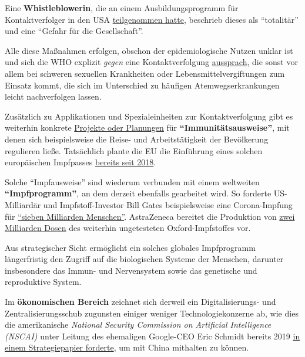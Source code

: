 Eine \textbf{Whistleblowerin}, die an einem Ausbildungsprogramm für
Kontaktverfolger in den USA
\href{https://www.youtube.com/watch?v=qFUyZWw7qoc}{teilgenommen hatte},
beschrieb dieses als ``totalitär'' und eine ``Gefahr für die
Gesellschaft''.

Alle diese Maßnahmen erfolgen, obschon der epidemiologische Nutzen
unklar ist und sich die WHO explizit \emph{gegen} eine Kontaktverfolgung
\href{https://apps.who.int/iris/bitstream/handle/10665/329438/9789241516839-eng.pdf\#page=9}{aussprach},
die sonst vor allem bei schweren sexuellen Krankheiten oder
Lebensmittelvergiftungen zum Einsatz kommt, die sich im Unterschied zu
häufigen Atemwegserkrankungen leicht nachverfolgen lassen.

Zusätzlich zu Applikationen und Spezialeinheiten zur Kontaktverfolgung
gibt es weiterhin konkrete
\href{https://www.msn.com/en-us/news/world/the-uk-government-is-in-talks-with-facial-recognition-firms-to-develop-covid-19-immunity-passports/ar-BB12J6It}{Projekte
oder Planungen} für \textbf{``Immunitätsausweise''}, mit denen sich
beispielsweise die Reise- und Arbeitstätigkeit der Bevölkerung
regulieren ließe. Tatsächlich plante die EU die Einführung eines solchen
europäischen Impfpasses
\href{https://off-guardian.org/2020/05/22/report-eu-planning-vaccination-passport-since-2018/}{bereits
seit 2018}.

Solche ``Impfausweise'' sind wiederum verbunden mit einem weltweiten
\textbf{``Impfprogramm''}, an dem derzeit ebenfalls gearbeitet wird. So
forderte US-Milliardär und Impfstoff-Investor Bill Gates beispielsweise
eine Corona-Impfung für
\href{https://www.businessinsider.com/bill-gates-14-billion-doses-coronavirus-vaccine-may-be-needed-2020-5}{``sieben
Milliarden Menschen''}. AstraZeneca bereitet die Produktion von
\href{https://www.sciencealert.com/2-billion-doses-of-oxford-s-potential-coronavirus-vaccine-could-soon-become-available}{zwei
Milliarden Dosen} des weiterhin ungetesteten Oxford-Impfstoffes vor.

Aus strategischer Sicht ermöglicht ein solches globales Impfprogramm
längerfristig den Zugriff auf die biologischen Systeme der Menschen,
darunter insbesondere das Immun- und Nervensystem sowie das genetische
und reproduktive System.

Im \textbf{ökonomischen Bereich} zeichnet sich derweil ein
Digitalisierungs- und Zentrali­sierungs­schub zugunsten einiger weniger
Technologiekonzerne ab, wie dies die amerikanische \emph{National
Security Commission on Artificial Intelligence (NSCAI)} unter Leitung
des ehemaligen Google-CEO Eric Schmidt bereits 2019
\href{http://unlimitedhangout.com/2020/05/reports/techno-tyranny-how-the-us-national-security-state-is-using-coronavirus-to-fulfill-an-orwellian-vision/}{in
einem Strategiepapier forderte}, um mit China mithalten zu können.\\

